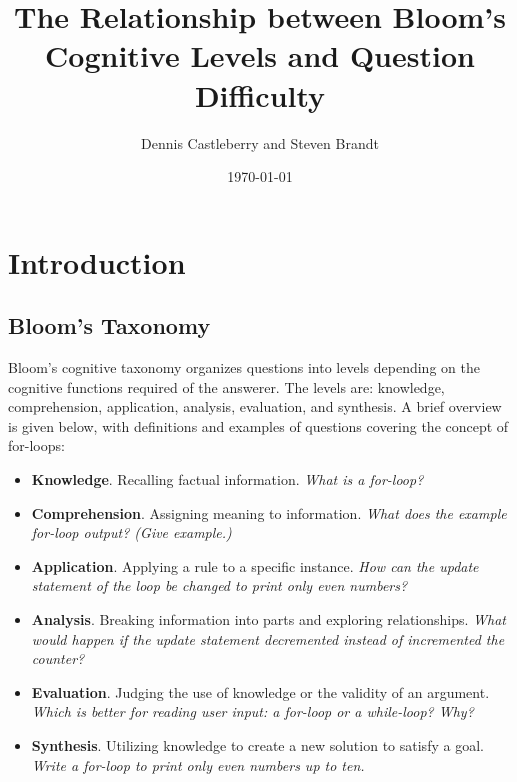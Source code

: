 \documentclass[a4paper,twocolumn]{article}
\title{
 The Relationship between Bloom's Cognitive Levels and Question Difficulty
}
\author{Dennis Castleberry and Steven Brandt}
\date{\today}
\begin{document}
\maketitle
\thispagestyle{empty}
\pagebreak



\section{Introduction}

\subsection{Bloom's Taxonomy}

Bloom's cognitive taxonomy organizes questions into levels depending on the
cognitive functions required of the answerer.  The levels are: knowledge,
comprehension, application, analysis, evaluation, and synthesis.  A brief
overview is given below, with definitions and examples of questions covering
the concept of for-loops:

\begin{itemize}

\item \textbf{Knowledge}. Recalling factual information.  \emph{What is a
for-loop?}

\item \textbf{Comprehension}. Assigning meaning to information.  \emph{What
does the example for-loop output? (Give example.)}

\item \textbf{Application}. Applying a rule to a specific instance.  \emph{How
can the update statement of the loop be changed to print only even numbers?}

\item \textbf{Analysis}. Breaking information into parts and exploring
relationships.  \emph{What would happen if the update statement decremented
instead of incremented the counter?}

\item \textbf{Evaluation}. Judging the use of knowledge or the validity of an
argument.  \emph{Which is better for reading user input: a for-loop or a
while-loop? Why?}

\item \textbf{Synthesis}. Utilizing knowledge to create a new solution to
satisfy a goal.  \emph{Write a for-loop to print only even numbers up to ten.}

\end{itemize}
\end{document}
